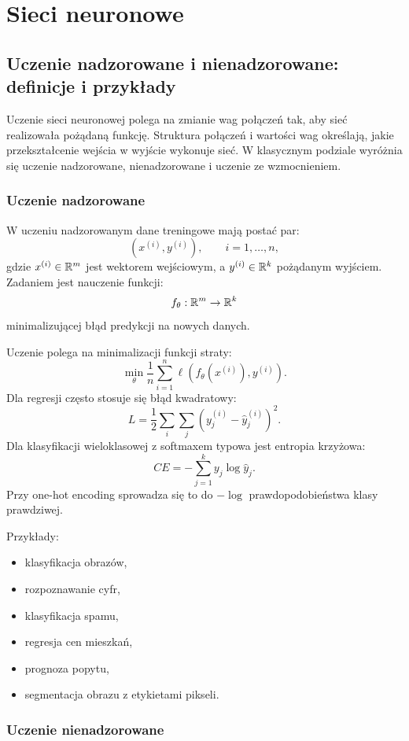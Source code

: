 \section{Sieci neuronowe}

\subsection{Uczenie nadzorowane i nienadzorowane: definicje i przykłady}

Uczenie sieci neuronowej polega na zmianie wag połączeń tak, aby sieć realizowała pożądaną funkcję. Struktura połączeń i wartości wag określają, jakie przekształcenie wejścia w wyjście wykonuje sieć. W klasycznym podziale wyróżnia się uczenie nadzorowane, nienadzorowane i uczenie ze wzmocnieniem.

\subsubsection{Uczenie nadzorowane}

W uczeniu nadzorowanym dane treningowe mają postać par:
\[
(x^{(i)},y^{(i)}),\qquad i=1,\dots,n,
\]
gdzie $x^{(i)}\in\mathbb{R}^m$ jest wektorem wejściowym, a $y^{(i)}\in\mathbb{R}^k$ pożądanym wyjściem. Zadaniem jest nauczenie funkcji:
\[
f_\theta:\mathbb{R}^m\to\mathbb{R}^k
\]
minimalizującej błąd predykcji na nowych danych.

Uczenie polega na minimalizacji funkcji straty:
\[
\min_\theta \frac{1}{n}\sum_{i=1}^{n} \ell(f_\theta(x^{(i)}),y^{(i)}).
\]
Dla regresji często stosuje się błąd kwadratowy:
\[
L=\frac{1}{2}\sum_i\sum_j(y_j^{(i)}-\hat y_j^{(i)})^2.
\]
Dla klasyfikacji wieloklasowej z softmaxem typowa jest entropia krzyżowa:
\[
CE=-\sum_{j=1}^{k}y_j\log \hat y_j.
\]
Przy one-hot encoding sprowadza się to do $-\log$ prawdopodobieństwa klasy prawdziwej.

Przykłady:
\begin{itemize}
  \item klasyfikacja obrazów,
  \item rozpoznawanie cyfr,
  \item klasyfikacja spamu,
  \item regresja cen mieszkań,
  \item prognoza popytu,
  \item segmentacja obrazu z etykietami pikseli.
\end{itemize}

\subsubsection{Uczenie nienadzorowane}

